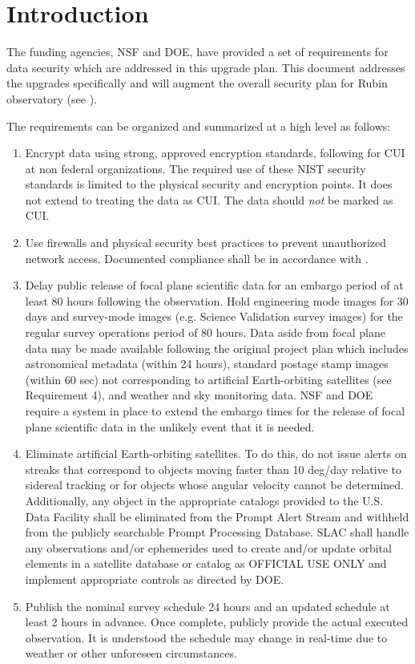 \section{Introduction}

The funding agencies, \gls{NSF} and \gls{DOE},  have provided a set of requirements for data security which are addressed in this upgrade plan.  This document addresses the upgrades specifically and will augment the overall security plan for Rubin observatory (see ).

The requirements can be organized and summarized at a high level as follows:
\begin{enumerate}

\item	Encrypt data using strong, approved encryption standards,  following  for \gls{CUI} at non federal organizations. The required use of these \gls{NIST} security standards is limited to the physical security and encryption points. It does not extend to treating the data as \gls{CUI}. The data should \emph{not} be marked as \gls{CUI}.
\item	Use firewalls and physical security best practices to prevent unauthorized network  access. Documented compliance shall be in accordance with .
\item	Delay public release of  focal plane scientific data for an embargo period of at least 80 hours following the  observation.
Hold engineering mode images for 30 days and survey-mode images (e.g. Science Validation survey images) for the regular survey operations period of 80 hours.
Data aside from focal plane data may be made available following the original project plan which includes astronomical metadata (within 24 hours), standard \gls{postage stamp} images (within 60 sec) not corresponding to artificial  Earth-orbiting satellites (see Requirement 4), and weather and sky monitoring data.
NSF and \gls{DOE} require a system in  place to extend the embargo times for the release of focal plane scientific data in the unlikely event that it is needed.

\item	Eliminate artificial Earth-orbiting satellites.
To do this, do not issue alerts on streaks that correspond to objects  moving faster than 10 \gls{deg}/day relative to sidereal tracking or for objects whose angular velocity cannot be determined.
Additionally, any object in the appropriate catalogs provided to the U.S. Data Facility shall be eliminated from the  Prompt \gls{Alert} Stream and withheld from the publicly searchable Prompt Processing Database.
SLAC shall handle any  observations and/or ephemerides used to create and/or update orbital elements in a satellite database or catalog as  OFFICIAL USE ONLY and implement appropriate controls as directed by \gls{DOE}.
\item	Publish the nominal survey schedule 24 hours and an updated schedule at least 2 hours in advance.
Once complete, publicly provide the actual executed observation.
It is understood the schedule may change in real-time due to  weather or other unforeseen circumstances.


\end{enumerate}

